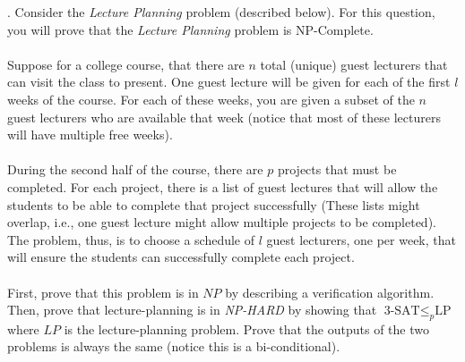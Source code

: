 \documentclass[12pt]{article}
\newcounter{quesnum}
\newcommand{\question}[2][??]{
\begin{list}{\labelitemi}{\leftmargin=2em}
\item [\arabic{quesnum}.] {#2}
\end{list}
\addtocounter{quesnum}{1}
}
\newcommand{\answer}[2][??]{ 
\ifthenelse{\boolean{solution}}{
\color{red} #2 \color{black}}
{\vspace*{#1}}
}
\begin{document}
\question[3]{
Consider the \emph{Lecture Planning} problem (described below). For this question, you will prove that the \emph{Lecture Planning} problem is NP-Complete.\\
\\
Suppose for a college course, that there are $n$ total (unique) guest lecturers that can visit the class to present. One guest lecture will be given for each of the first $l$ weeks of the course. For each of these weeks, you are given a subset of the $n$ guest lecturers who are available that week (notice that most of these lecturers will have multiple free weeks).\\
\\
During the second half of the course, there are $p$ projects that must be completed. For each project, there is a list of guest lectures that will allow the students to be able to complete that project successfully (These lists might overlap, i.e., one guest lecture might allow multiple projects to be completed). The problem, thus, is to choose a schedule of $l$ guest lecturers, one per week, that will ensure the students can successfully complete each project.\\
\\
First, prove that this problem is in $NP$ by describing a verification algorithm. Then, prove that lecture-planning is in \emph{NP-HARD} by showing that $\text{3-SAT} \leq_p \text{LP}$ where $LP$ is the lecture-planning problem. Prove that the outputs of the two problems is always the same (notice this is a bi-conditional).
}

\answer[0 in]{
...
}


\end{document}
